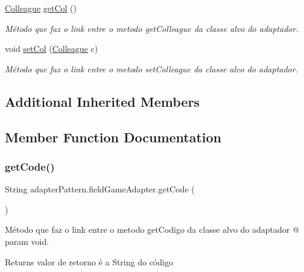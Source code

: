 \begin{DoxyCompactItemize}
\mbox{\hyperlink{classmediator_pattern_1_1_colleague}{Colleague}} \mbox{\hyperlink{classadapter_pattern_1_1field_game_adapter_acdddca2c22e22b6b52dcd4d9d6cd06fc}{get\+Col}} ()
\begin{DoxyCompactList}\small\item\em Método que faz o link entre o metodo get\+Colleague da classe alvo do adaptador. \end{DoxyCompactList}\item 
void \mbox{\hyperlink{classadapter_pattern_1_1field_game_adapter_a1b2122a14b0bab5a09d065da2bd7e4bc}{set\+Col}} (\mbox{\hyperlink{classmediator_pattern_1_1_colleague}{Colleague}} c)
\begin{DoxyCompactList}\small\item\em Método que faz o link entre o metodo set\+Colleague da classe alvo do adaptador. \end{DoxyCompactList}\end{DoxyCompactItemize}
\subsection*{Additional Inherited Members}


\subsection{Member Function Documentation}
\mbox{\label{classadapter_pattern_1_1field_game_adapter_ac7a3e7caa73d727325f59198db4f1674}} 
\subsubsection{\texorpdfstring{getCode()}{getCode()}}
{\footnotesize\ttfamily String adapter\+Pattern.\+field\+Game\+Adapter.\+get\+Code (\begin{DoxyParamCaption}{ }\end{DoxyParamCaption})}



Método que faz o link entre o metodo get\+Codigo da classe alvo do adaptador @ param void. 

\begin{DoxyReturn}{Returns}
valor de retorno é a String do código 
\end{DoxyReturn}


